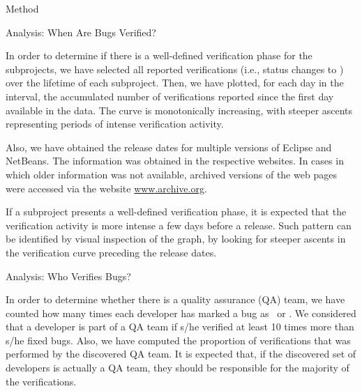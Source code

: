 \begin{section}{Method}
\begin{subsection}{Analysis: When Are Bugs Verified?}
	
	In order to determine if there is a well-defined verification phase for the subprojects, we have selected all reported verifications (i.e., status changes to \VERIFIED) over the lifetime of each subproject. Then, we have plotted, for each day in the interval, the accumulated number of verifications reported since the first day available in the data. The curve is monotonically increasing, with steeper ascents representing periods of intense verification activity.
	
	Also, we have obtained the release dates for multiple versions of Eclipse and NetBeans. The information was obtained in the respective websites. In cases in which older information was not available, archived versions of the web pages were accessed via the website \url{www.archive.org}.
	
	If a subproject presents a well-defined verification phase, it is expected that the verification activity is more intense a few days before a release. Such pattern can be identified by visual inspection of the graph, by looking for steeper ascents in the verification curve preceding the release dates.
	
\end{subsection}

\begin{subsection}{Analysis: Who Verifies Bugs?}
	
	In order to determine whether there is a quality assurance (QA) team, we have counted how many times each developer has marked a bug as \FIXED\ or \VERIFIED. We considered that a developer is part of a QA team if s/he verified at least 10 times more than s/he fixed bugs. Also, we have computed the proportion of verifications that was performed by the discovered QA team. It is expected that, if the discovered set of developers is actually a QA team, they should be responsible for the majority of the verifications.
	
\end{subsection}

\end{section}

